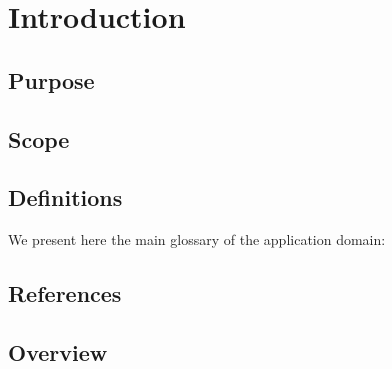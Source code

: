 \chapter{Introduction}

\section{Purpose}
\section{Scope}
\section{Definitions}
We present here the main glossary of the application domain:
\section{References}
\section{Overview}
